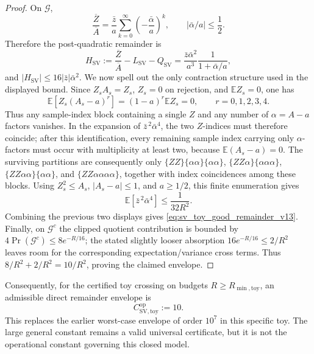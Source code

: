 \documentclass[11pt]{article}
\newcommand{\E}{\mathbb{E}}
\newcommand{\1}{\mathbf{1}}
\newcommand{\abs}[1]{\left\lvert #1 \right\rvert}
\begin{document}
\begin{proof}
On \(\mathcal G\),
\begin{equation}
    \frac{\overline Z}{\overline A}
    =\frac{\bar z}{a}\sum_{k=0}^\infty\left(-\frac{\bar\alpha}{a}\right)^k,
    \qquad
    \abs{\bar\alpha/a}\le\frac12.
\end{equation}
Therefore the post-quadratic remainder is
\begin{equation}
    H_{\mathrm{SV}}
    :=\frac{\overline Z}{\overline A}-L_{\mathrm{SV}}-Q_{\mathrm{SV}}
    =\frac{\bar z\bar\alpha^2}{a^3}\frac{1}{1+\bar\alpha/a},
\end{equation}
and \(\abs{H_{\mathrm{SV}}}\le16\abs{\bar z}\bar\alpha^2\).  We now spell out the only contraction structure used in the displayed bound.  Since \(Z_sA_s=Z_s\), \(Z_s=0\) on rejection, and \(\E Z_s=0\), one has
\begin{equation}
    \E[Z_s(A_s-a)^r]=(1-a)^r\E Z_s=0,
    \qquad r=0,1,2,3,4.
    \label{eq:single_Z_block_v14}
\end{equation}
Thus any sample-index block containing a single \(Z\) and any number of \(\alpha=A-a\) factors vanishes.  In the expansion of \(\bar z^{\,2}\bar\alpha^4\), the two \(Z\)-indices must therefore coincide; after this identification, every remaining sample index carrying only \(\alpha\)-factors must occur with multiplicity at least two, because \(\E(A_s-a)=0\).  The surviving partitions are consequently only \(\{ZZ\}\{\alpha\alpha\}\{\alpha\alpha\}\), \(\{ZZ\alpha\}\{\alpha\alpha\alpha\}\), \(\{ZZ\alpha\alpha\}\{\alpha\alpha\}\), and \(\{ZZ\alpha\alpha\alpha\alpha\}\), together with index coincidences among these blocks.  Using \(Z_s^2\le A_s\), \(\abs{A_s-a}\le1\), and \(a\ge1/2\), this finite enumeration gives
\begin{equation}
    \E[\bar z^{\,2}\bar\alpha^{4}]
    \le \frac{1}{32R^2}.
    \label{eq:sv_toy_contraction_bound_v13}
\end{equation}
Combining the previous two displays gives \cref{eq:sv_toy_good_remainder_v13}.  Finally, on \(\mathcal G^c\) the clipped quotient contribution is bounded by \(4\Pr(\mathcal G^c)\le8e^{-R/16}\); the stated slightly looser absorption \(16e^{-R/16}\le2/R^2\) leaves room for the corresponding expectation/variance cross terms.  Thus \(8/R^2+2/R^2=10/R^2\), proving the claimed envelope.
\end{proof}

Consequently, for the certified toy crossing on budgets \(R\ge R_{\min,\mathrm{toy}}\), an admissible direct remainder envelope is
\begin{equation}
    C_{\mathrm{SV},\mathrm{toy}}^{\mathrm{op}}:=10.
    \label{eq:Ctoy_operational_final}
\end{equation}
This replaces the earlier worst-case envelope of order \(10^7\) in this specific toy.  The large general constant remains a valid universal certificate, but it is not the operational constant governing this closed model.
\end{document}
